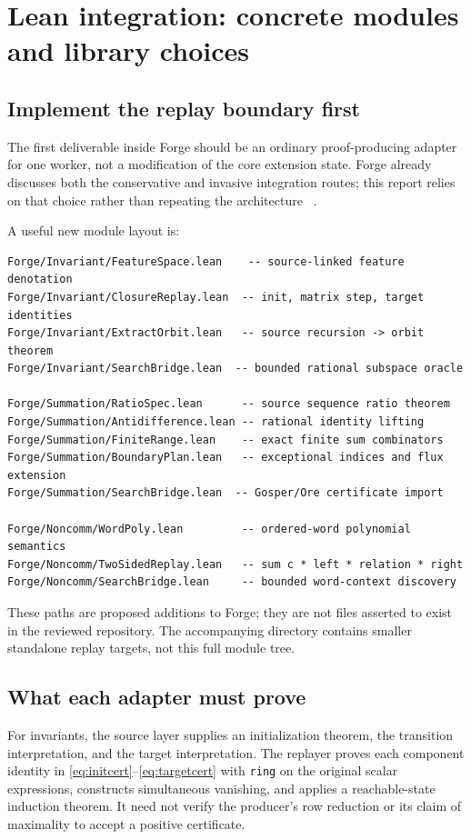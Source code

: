 \documentclass[11pt,letterpaper]{article}
\newcommand{\code}[1]{\texttt{#1}}
\theoremstyle{definition}\newtheorem{definition}[theorem]{Definition}
\theoremstyle{remark}\newtheorem{remark}[theorem]{Remark}
\begin{document}
\section{Lean integration: concrete modules and library choices}
\label{sec:integration}

\subsection{Implement the replay boundary first}
The first deliverable inside Forge should be an ordinary proof-producing
adapter for one worker, not a modification of the core \grind{} extension
state. Forge already discusses both the conservative and invasive integration
routes; this report relies on that choice rather than repeating the architecture
~\cite{forge-integration}.

A useful new module layout is:
\par\noindent\begin{minipage}{\linewidth}
\begin{lstlisting}
Forge/Invariant/FeatureSpace.lean    -- source-linked feature denotation
Forge/Invariant/ClosureReplay.lean  -- init, matrix step, target identities
Forge/Invariant/ExtractOrbit.lean   -- source recursion -> orbit theorem
Forge/Invariant/SearchBridge.lean  -- bounded rational subspace oracle

Forge/Summation/RatioSpec.lean      -- source sequence ratio theorem
Forge/Summation/Antidifference.lean -- rational identity lifting
Forge/Summation/FiniteRange.lean    -- exact finite sum combinators
Forge/Summation/BoundaryPlan.lean   -- exceptional indices and flux extension
Forge/Summation/SearchBridge.lean  -- Gosper/Ore certificate import

Forge/Noncomm/WordPoly.lean         -- ordered-word polynomial semantics
Forge/Noncomm/TwoSidedReplay.lean   -- sum c * left * relation * right
Forge/Noncomm/SearchBridge.lean     -- bounded word-context discovery
\end{lstlisting}
\end{minipage}\par\smallskip
These paths are proposed additions to Forge; they are not files asserted to
exist in the reviewed repository. The accompanying  directory
contains smaller standalone replay targets, not this full module tree.

\subsection{What each adapter must prove}
For invariants, the source layer supplies an initialization theorem, the
transition interpretation, and the target interpretation. The replayer proves
each component identity in \eqref{eq:initcert}--\eqref{eq:targetcert} with
\code{ring} on the original scalar expressions, constructs simultaneous
vanishing, and applies a reachable-state induction theorem. It need not verify
the producer's row reduction or its claim of maximality to accept a positive
certificate.
\end{document}
